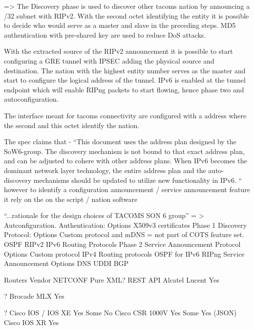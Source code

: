 => The Discovery phase is used to discover other \gls{tacoms} nation by announcing a /32 subnet with RIPv2. With the second octet identifying the entity it is possible to decide who would serve as a master and slave in the preceding steps. MD5 authentication with pre-shared key are used to reduce DoS attacks. 

With the extracted source of the RIPv2 announcement it is possible to start configuring a GRE tunnel with IPSEC adding the physical source and destination. The nation with the highest entity number serves as the master and start to configure the logical address of the tunnel. IPv6 is enabled at the tunnel endpoint which will enable RIPng packets to start flowing, hence phase two and autoconfiguration. 
 

The interface meant for \gls{tacoms} connectivity are configured with a  address where the second and this octet identify the nation.



The spec claims that - “This document uses the address plan designed by the SoW6-group. The discovery mechanism is not bound to that exact address plan, and can be adjusted to cohere with other address plans. When IPv6 becomes the dominant network layer technology, the entire address plan and the auto-discovery mechanisms should be updated to utilize new functionality in IPv6. “  however to identify a configuration announcement / service announcement feature it rely on the  on the script / nation software  



 \cite{tacoms_t6_autoconf_techspec}

\cite{T6-Concept_options} “...rationale for the design choices of TACOMS SON 6 group” = > Autconfiguration.
Authentication:
Options
X509v3 certificates 
Phase 1 Discovery Protocol:
Options
Custom protocol and mDNS = not part of COTS feature set. 
OSPF
RIPv2 
IPv6 Routing Protocols
Phase 2 Service Announcement Protocol
Options
Custom protocol
IPv4 Routing protocols
OSPF for IPv6
RIPng
Service Announcement
Options
DNS
UDDI
BGP



\cite{http://blog.ipspace.net/2015/10/survey-vendor-netconf-and-rest-api.html}
Routers
Vendor
NETCONF
Pure XML?
REST API
Alcatel Lucent
Yes


?
Brocade MLX
Yes


?
Cisco IOS / IOS XE
Yes
Some
No
Cisco CSR 1000V
Yes
Some
Yes (JSON)
Cisco IOS XR
Yes


